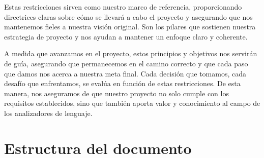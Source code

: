 Estas restricciones sirven como nuestro marco de referencia, proporcionando directrices claras sobre cómo se llevará a cabo el proyecto y asegurando que nos mantenemos fieles a nuestra visión original. Son los pilares que sostienen nuestra estrategia de proyecto y nos ayudan a mantener un enfoque claro y coherente.

A medida que avanzamos en el proyecto, estos principios y objetivos nos servirán de guía, asegurando que permanecemos en el camino correcto y que cada paso que damos nos acerca a nuestra meta final. Cada decisión que tomamos, cada desafío que enfrentamos, se evalúa en función de estas restricciones. De esta manera, nos aseguramos de que nuestro proyecto no solo cumple con los requisitos establecidos, sino que también aporta valor y conocimiento al campo de los analizadores de lenguaje.

\section{Estructura del documento}





